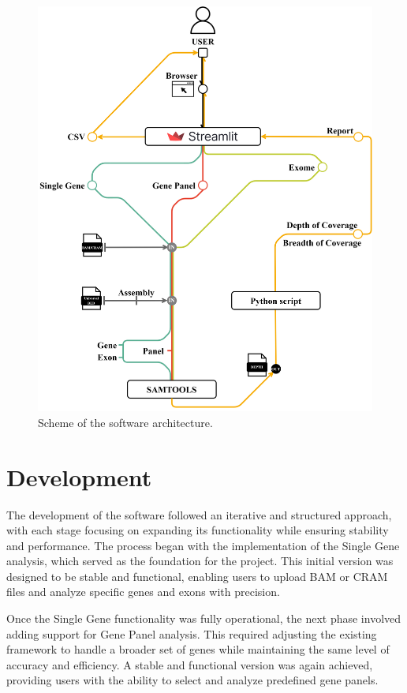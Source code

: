 \begin{figure}[H]
    \centering
    \includegraphics[width=1\textwidth]{figs/architecture.png}
    \caption{Scheme of the software architecture.} 
    \label{fig:architecture}
\end{figure}



\section{Development}

The development of the software followed an iterative and structured approach, with each stage focusing on expanding its functionality while ensuring stability and performance. The process began with the implementation of the Single Gene analysis, which served as the foundation for the project. This initial version was designed to be stable and functional, enabling users to upload BAM or CRAM files and analyze specific genes and exons with precision.

Once the Single Gene functionality was fully operational, the next phase involved adding support for Gene Panel analysis. This required adjusting the existing framework to handle a broader set of genes while maintaining the same level of accuracy and efficiency. A stable and functional version was again achieved, providing users with the ability to select and analyze predefined gene panels.

